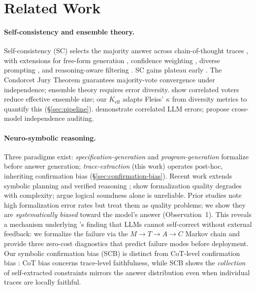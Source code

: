 \section{Related Work}
\label{sec:related-work}

\paragraph{Self-consistency and ensemble theory.}
Self-consistency (SC) selects the majority answer across chain-of-thought traces \citep{wang2023sc}, with extensions for free-form generation \citep{chen2024usc}, confidence weighting \citep{taubenfeld2025cisc}, diverse prompting \citep{li2023diverse}, and reasoning-aware filtering \citep{wan2024rasc, toh2024notallvotes, kim2026reasc}. SC gains plateau early \citep{loo2025reevaluating, byerly2025selfconsistency}. The Condorcet Jury Theorem \citep{condorcet1785} guarantees majority-vote convergence under independence; ensemble theory \citep{dietterich2000ensemble, krogh1994neural} requires error diversity. \citet{ladha1992correlated} show correlated voters reduce effective ensemble size; our $K_\text{eff}$ adapts Fleiss' $\kappa$ from diversity metrics \citep{kuncheva2003measures, brown2005diversity} to quantify this (\S\ref{sec:pipeline}). \citet{kim2025correlated} demonstrate correlated LLM errors; \citet{kuai2026independent} propose cross-model independence auditing.

\paragraph{Neuro-symbolic reasoning.}
Three paradigms exist: \emph{specification-generation} \citep{pan2023logiclm, olausson2023linc, ye2024satlm} and \emph{program-generation} \citep{gao2023pal, chen2023program, lyu2023faithful} formalize before answer generation; \emph{trace-extraction} (this work) operates post-hoc, inheriting confirmation bias (\S\ref{sec:confirmation-bias}). Recent work extends symbolic planning and verified reasoning \citep{ryu2025clover, xu2026dylos, li2025aristotle, wang2025fover, singh2026verge, luo2025logicagent, miya2025eidoku}; \citet{amonkar2025realitycheck} show formalization quality degrades with complexity; \citet{chan2026position} argue logical soundness alone is unreliable. Prior studies note high formalization error rates but treat them as quality problems; we show they are \emph{systematically biased} toward the model's answer (Observation~1). This reveals a mechanism underlying \citet{huang2024selfcorrect}'s finding that LLMs cannot self-correct without external feedback: we formalize the failure via the $M{\to}T{\to}A{\to}C$ Markov chain and provide three zero-cost diagnostics that predict failure modes before deployment. Our symbolic confirmation bias (SCB) is distinct from CoT-level confirmation bias \citep{wan2025unveiling, turpin2023language, jhaveri2026failing}: CoT bias concerns trace-level faithfulness, while SCB shows the \emph{collection} of self-extracted constraints mirrors the answer distribution even when individual traces are locally faithful.

